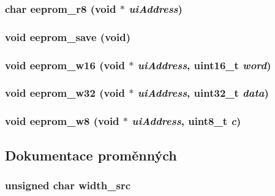 \subsubsection[{eeprom\_\-r8}]{\setlength{\rightskip}{0pt plus 5cm}char eeprom\_\-r8 (void $\ast$ {\em uiAddress})}\label{eeprom_8h_aaf8e0160a22f011071c6eef05108dd02}
\subsubsection[{eeprom\_\-save}]{\setlength{\rightskip}{0pt plus 5cm}void eeprom\_\-save (void)}\label{eeprom_8h_a967222c6b1a76007b1656eca35ff7c08}
\subsubsection[{eeprom\_\-w16}]{\setlength{\rightskip}{0pt plus 5cm}void eeprom\_\-w16 (void $\ast$ {\em uiAddress}, \/  uint16\_\-t {\em word})}\label{eeprom_8h_aacd26e87298620ea075952631cdfe66a}
\subsubsection[{eeprom\_\-w32}]{\setlength{\rightskip}{0pt plus 5cm}void eeprom\_\-w32 (void $\ast$ {\em uiAddress}, \/  uint32\_\-t {\em data})}\label{eeprom_8h_af83bc20fbdc5083109537fd2db28fa13}
\subsubsection[{eeprom\_\-w8}]{\setlength{\rightskip}{0pt plus 5cm}void eeprom\_\-w8 (void $\ast$ {\em uiAddress}, \/  uint8\_\-t {\em c})}\label{eeprom_8h_ab66d92098db926da6dd7f28c9886d884}


\subsection{Dokumentace proměnných}
\subsubsection[{width\_\-src}]{\setlength{\rightskip}{0pt plus 5cm}unsigned char {\bf width\_\-src}}\label{eeprom_8h_a438d690afcf99fcf144f660af7e2cddc}
